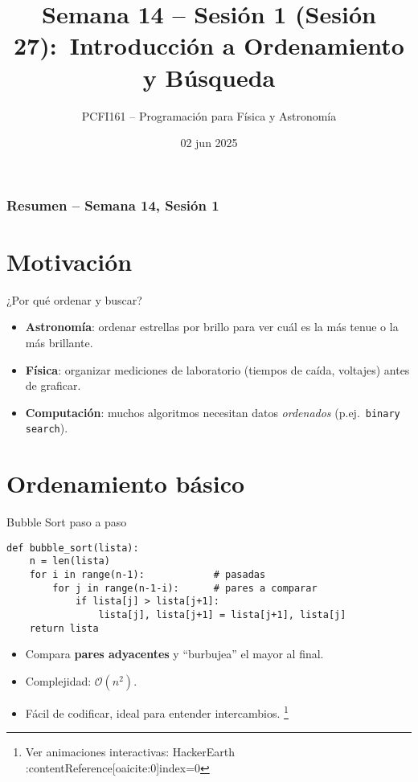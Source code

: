 \documentclass[10pt]{beamer}
\title{Semana 14 – Sesión 1 (Sesión 27):\
Introducción a Ordenamiento y Búsqueda}
\author{PCFI161 – Programación para Física y Astronomía}
\date{02 jun 2025}
\begin{document}
\myfront{}
\begin{frame}\titlepage\end{frame}

\begin{frame}
  \frametitle{Resumen -- Semana 14, Sesión 1}
  \tableofcontents
\end{frame}

\metroset{block=fill}

\section{Motivación}
\begin{frame}{¿Por qué ordenar y buscar?}
\begin{itemize}
  \item \textbf{Astronomía}: ordenar estrellas por brillo para ver cuál es la más tenue o la más brillante.
  \item \textbf{Física}: organizar mediciones de laboratorio (tiempos de caída, voltajes) antes de graficar.
  \item \textbf{Computación}: muchos algoritmos necesitan datos \emph{ordenados} (p.ej.\ \texttt{binary search}). 
\end{itemize}
\end{frame}

\section{Ordenamiento básico}
\begin{frame}[fragile]{Bubble Sort paso a paso}
\begin{verbatim}
def bubble_sort(lista):
    n = len(lista)
    for i in range(n-1):            # pasadas
        for j in range(n-1-i):      # pares a comparar
            if lista[j] > lista[j+1]:
                lista[j], lista[j+1] = lista[j+1], lista[j]
    return lista
\end{verbatim}
\begin{itemize}
  \item Compara \textbf{pares adyacentes} y “burbujea” el mayor al final.  
  \item Complejidad: \(\mathcal{O}(n^{2})\).  
  \item Fácil de codificar, ideal para entender intercambios.  \footnote{Ver animaciones interactivas: HackerEarth :contentReference[oaicite:0]{index=0}}
\end{itemize}
\end{frame}
\end{document}
